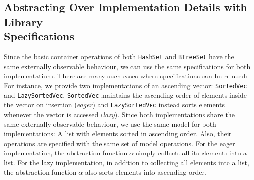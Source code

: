 \subsection{Abstracting Over Implementation Details with Library\\Specifications}
\label{chap2:lib:abstracting}
Since the basic container operations of both \lstinline|HashSet| and \lstinline|BTreeSet| have the same externally observable behaviour, we can use the same specifications for both implementations.
There are many such cases where specifications can be re-used: For instance, we provide two implementations of an ascending vector: \lstinline{SortedVec} and \lstinline{LazySortedVec}. \lstinline{SortedVec} maintains the ascending order of elements inside the vector on insertion (\emph{eager}) and \lstinline{LazySortedVec} instead sorts elements whenever the vector is accessed (\emph{lazy}). 
Since both implementations share the same externally observable behaviour, we use the same model for both implementations: A list with elements sorted in ascending order.
Also, their operations are specified with the same set of model operations.
For the eager implementation, the abstraction function $\alpha$ simply collects all its elements into a list. For the lazy implementation, in addition to collecting all elements into a list, the abstraction function $\alpha$ also sorts elements into ascending order.


 

